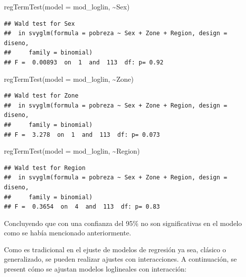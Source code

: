 \documentclass[
  12pt,
]{book}
\newenvironment{Shaded}{\begin{snugshade}}{\end{snugshade}}
\newcommand{\AttributeTok}[1]{\textcolor[rgb]{0.77,0.63,0.00}{#1}}
\newcommand{\FunctionTok}[1]{\textcolor[rgb]{0.00,0.00,0.00}{#1}}
\newcommand{\NormalTok}[1]{#1}
\newcommand{\SpecialCharTok}[1]{\textcolor[rgb]{0.00,0.00,0.00}{#1}}
\begin{document}
\begin{Shaded}
\begin{Highlighting}[]
  \FunctionTok{regTermTest}\NormalTok{(}\AttributeTok{model =}\NormalTok{ mod\_loglin, }\SpecialCharTok{\textasciitilde{}}\NormalTok{Sex)}
\end{Highlighting}
\end{Shaded}

\begin{verbatim}
## Wald test for Sex
##  in svyglm(formula = pobreza ~ Sex + Zone + Region, design = diseno, 
##     family = binomial)
## F =  0.00893  on  1  and  113  df: p= 0.92
\end{verbatim}

\begin{Shaded}
\begin{Highlighting}[]
  \FunctionTok{regTermTest}\NormalTok{(}\AttributeTok{model =}\NormalTok{ mod\_loglin, }\SpecialCharTok{\textasciitilde{}}\NormalTok{Zone)}
\end{Highlighting}
\end{Shaded}

\begin{verbatim}
## Wald test for Zone
##  in svyglm(formula = pobreza ~ Sex + Zone + Region, design = diseno, 
##     family = binomial)
## F =  3.278  on  1  and  113  df: p= 0.073
\end{verbatim}

\begin{Shaded}
\begin{Highlighting}[]
  \FunctionTok{regTermTest}\NormalTok{(}\AttributeTok{model =}\NormalTok{ mod\_loglin, }\SpecialCharTok{\textasciitilde{}}\NormalTok{Region)}
\end{Highlighting}
\end{Shaded}

\begin{verbatim}
## Wald test for Region
##  in svyglm(formula = pobreza ~ Sex + Zone + Region, design = diseno, 
##     family = binomial)
## F =  0.3654  on  4  and  113  df: p= 0.83
\end{verbatim}

Concluyendo que con una confianza del 95\% no son significativas en el modelo como se había mencionado anteriormente.

Como es tradicional en el ejuste de modelos de regresión ya sea, clásico o generalizado, se pueden realizar ajustes con interacciones. A continuación, se present cómo se ajustan modelos loglineales con interacción:
\end{document}
